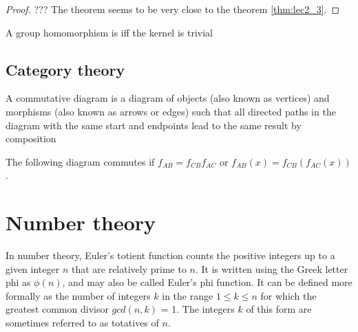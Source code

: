 \begin{appendices}
\begin{theorem}
\begin{proof}
    ??? The theorem seems to be very close to the theorem
    \ref{thm:lec2_3}. 
  \end{proof}
  
  \label{thm:isomorphismextension}
\end{theorem}

\begin{theorem}
  A group homomorphism is  iff the kernel is
  trivial \cite{wiki:grouphomomorphism}
  \label{thm:grouphomomorphsim}
\end{theorem}

\subsection{Category theory}

\begin{definition}
  A commutative diagram is a diagram of objects (also known as
  vertices) and morphisms (also known as arrows or edges) such that
  all directed paths in the diagram with the same start and endpoints
  lead to the same result by composition
  \label{def:commutativediagram}

  The following diagram commutes if $f_{AB} = f_{CB} f_{AC}$ or
  $f_{AB}\left(x\right) = f_{CB} \left(f_{AC}\left(x\right)\right)$.

\end{definition}

\section{Number theory}

\begin{definition}
  In number theory, Euler's totient function counts the positive
  integers up to a given integer $n$ that are relatively prime to $n$. It
  is written using the Greek letter phi as $\phi\left(n\right)$, and
  may also be called Euler's phi function. It can be defined more formally as
  the number of integers $k$ in the range $1 \le k \le n$ for which the
  greatest common divisor $gcd\left(n, k\right)$ = 1. The integers $k$ of this
  form are sometimes referred to as totatives of $n$.


\end{definition}
\end{appendices}
